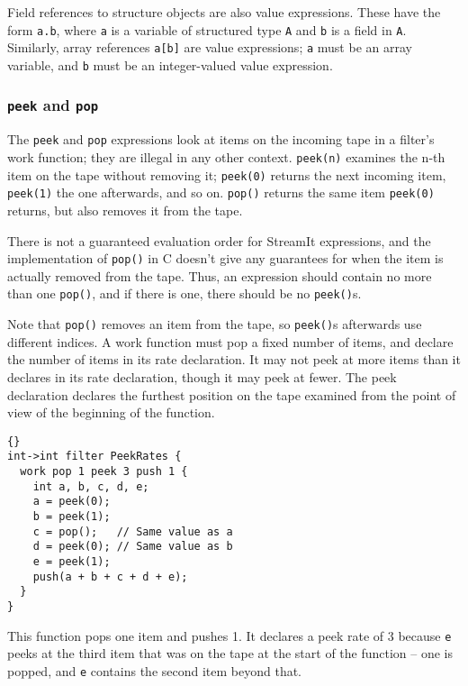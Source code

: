 \documentclass[11pt]{article}
\begin{document}
Field references to structure objects are also value expressions.
These have the form \lstinline|a.b|, where \lstinline|a| is a variable of
structured type \lstinline|A| and \lstinline|b| is a field in \lstinline|A|.
Similarly, array references \lstinline|a[b]| are value expressions;
\lstinline|a| must be an array variable, and \lstinline|b| must be an
integer-valued value expression.

\subsubsection{\lstinline|peek| and \lstinline|pop|}
\label{sec:expr-peek-pop}

The \lstinline|peek| and \lstinline|pop| expressions look at items on
the incoming tape in a filter's work function; they are illegal in any
other context.  \lstinline|peek(n)| examines the n-th item on the tape
without removing it; \lstinline|peek(0)| returns the next incoming
item, \lstinline|peek(1)| the one afterwards, and so on.
\lstinline|pop()| returns the same item \lstinline|peek(0)| returns,
but also removes it from the tape.

\begin{note}
There is not a guaranteed evaluation order for StreamIt expressions,
and the implementation of \lstinline|pop()| in C doesn't give any
guarantees for when the item is actually removed from the tape.  Thus,
an expression should contain no more than one \lstinline|pop()|, and
if there is one, there should be no \lstinline|peek()|s.
\end{note}

Note that \lstinline|pop()| removes an item from the tape, so
\lstinline|peek()|s afterwards use different indices.  A work function
must pop a fixed number of items, and declare the number of items in
its rate declaration.  It may not peek at more items than it declares
in its rate declaration, though it may peek at fewer.  The peek
declaration declares the furthest position on the tape examined from
the point of view of the beginning of the function.

\begin{lstlisting}{}
int->int filter PeekRates {
  work pop 1 peek 3 push 1 {
    int a, b, c, d, e;
    a = peek(0);
    b = peek(1);
    c = pop();   // Same value as a
    d = peek(0); // Same value as b
    e = peek(1);
    push(a + b + c + d + e);
  }
}
\end{lstlisting}

This function pops one item and pushes 1.  It declares a peek rate of
3 because \lstinline|e| peeks at the third item that was on the tape
at the start of the function -- one is popped, and \lstinline|e|
contains the second item beyond that.
\end{document}
